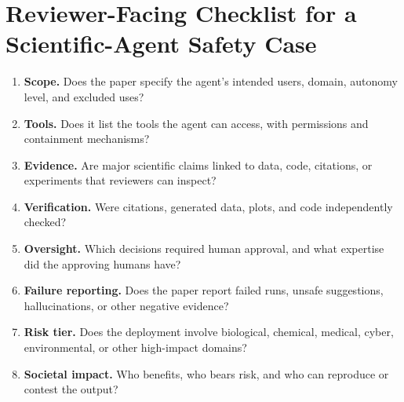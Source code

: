 \documentclass{article}
\begin{document}
\appendix
\section{Reviewer-Facing Checklist for a Scientific-Agent Safety Case}
\label{app:checklist}
\small
\begin{enumerate}
  \item \textbf{Scope.} Does the paper specify the agent's intended users, domain, autonomy level, and excluded uses?
  \item \textbf{Tools.} Does it list the tools the agent can access, with permissions and containment mechanisms?
  \item \textbf{Evidence.} Are major scientific claims linked to data, code, citations, or experiments that reviewers can inspect?
  \item \textbf{Verification.} Were citations, generated data, plots, and code independently checked?
  \item \textbf{Oversight.} Which decisions required human approval, and what expertise did the approving humans have?
  \item \textbf{Failure reporting.} Does the paper report failed runs, unsafe suggestions, hallucinations, or other negative evidence?
  \item \textbf{Risk tier.} Does the deployment involve biological, chemical, medical, cyber, environmental, or other high-impact domains?
  \item \textbf{Societal impact.} Who benefits, who bears risk, and who can reproduce or contest the output?
\end{enumerate}
\end{document}
